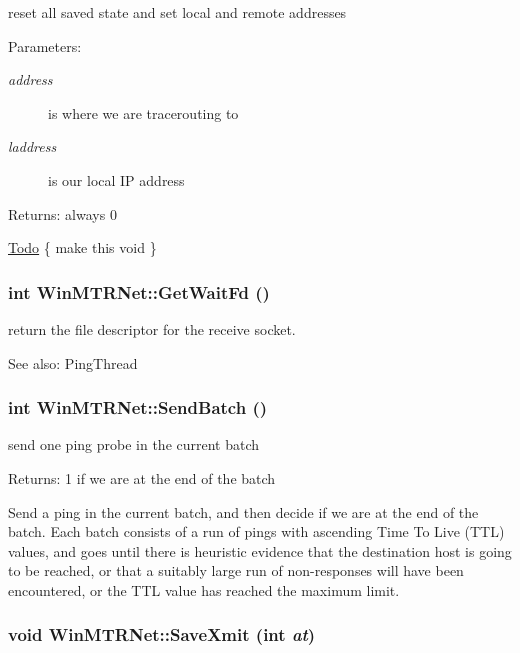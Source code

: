 reset all saved state and set local and remote addresses \begin{Desc}
\item[Parameters:]
\begin{description}
\item[{\em address}]is where we are tracerouting to \item[{\em laddress}]is our local IP address \end{description}
\end{Desc}
\begin{Desc}
\item[Returns:]always 0 \end{Desc}
\begin{Desc}
\item[\hyperlink{todo__todo000005}{Todo}]\{ make this void \} \end{Desc}
\hypertarget{classWinMTRNet_81d1b9da7ce2c49d0b073c2413f4a564}{
\subsubsection[GetWaitFd]{\setlength{\rightskip}{0pt plus 5cm}int WinMTRNet::GetWaitFd ()}}
\label{classWinMTRNet_81d1b9da7ce2c49d0b073c2413f4a564}


return the file descriptor for the receive socket. 

\begin{Desc}
\item[See also:]PingThread \end{Desc}
\hypertarget{classWinMTRNet_f12b703c5d313be05f98316c720ce808}{
\subsubsection[SendBatch]{\setlength{\rightskip}{0pt plus 5cm}int WinMTRNet::SendBatch ()}}
\label{classWinMTRNet_f12b703c5d313be05f98316c720ce808}


send one ping probe in the current batch \begin{Desc}
\item[Returns:]1 if we are at the end of the batch\end{Desc}
Send a ping in the current batch, and then decide if we are at the end of the batch. Each batch consists of a run of pings with ascending Time To Live (TTL) values, and goes until there is heuristic evidence that the destination host is going to be reached, or that a suitably large run of non-responses will have been encountered, or the TTL value has reached the maximum limit. \hypertarget{classWinMTRNet_1c19487407ac366b7f5f07bf78b183d6}{
\subsubsection[SaveXmit]{\setlength{\rightskip}{0pt plus 5cm}void WinMTRNet::SaveXmit (int {\em at})}}
\label{classWinMTRNet_1c19487407ac366b7f5f07bf78b183d6}


